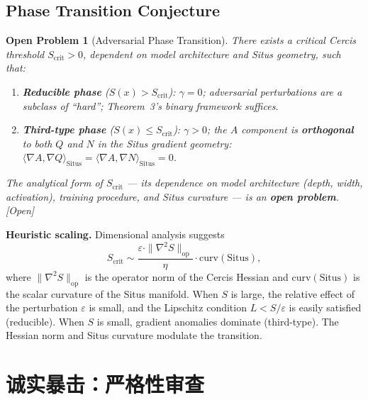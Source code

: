 \documentclass[12pt,a4paper]{article}
\newtheorem{openproblem}[theorem]{Open Problem}
\newcommand{\openquest}{\textcolor{red!70!black}{\small\textsf{[Open]}}}
\newcommand{\Situs}{\mathrm{Situs}}
\begin{document}
\subsection{Phase Transition Conjecture}

\begin{openproblem}[Adversarial Phase Transition]
\label{conj:phase}
There exists a critical Cercis threshold $S_{\mathrm{crit}} > 0$, dependent
on model architecture and Situs geometry, such that:
\begin{enumerate}[label=(\roman*)]
    \item \textbf{Reducible phase} ($S(x) > S_{\mathrm{crit}}$):
          $\gamma = 0$; adversarial perturbations are a subclass of ``hard'';
          Theorem~3's binary framework suffices.
    \item \textbf{Third-type phase} ($S(x) \leq S_{\mathrm{crit}}$):
          $\gamma > 0$; the $A$ component is \textbf{orthogonal} to both
          $Q$ and $N$ in the Situs gradient geometry:
          $\langle \nabla A, \nabla Q \rangle_{\Situs} =
           \langle \nabla A, \nabla N \rangle_{\Situs} = 0$.
\end{enumerate}
The analytical form of $S_{\mathrm{crit}}$ --- its dependence on model
architecture (depth, width, activation), training procedure, and Situs
curvature --- is an \textbf{open problem}.  \openquest
\end{openproblem}

\medskip\noindent
\textbf{Heuristic scaling.}
Dimensional analysis suggests
\begin{equation}\label{eq:Scrit-heuristic}
    S_{\mathrm{crit}} \sim
    \frac{\varepsilon \cdot \|\nabla^2 S\|_{\mathrm{op}}}{\eta}
    \cdot \mathrm{curv}(\Situs),
\end{equation}
where $\|\nabla^2 S\|_{\mathrm{op}}$ is the operator norm of the Cercis
Hessian and $\mathrm{curv}(\Situs)$ is the scalar curvature of the Situs
manifold.  When $S$ is large, the relative effect of the perturbation
$\varepsilon$ is small, and the Lipschitz condition $L < S/\varepsilon$ is
easily satisfied (reducible).  When $S$ is small, gradient anomalies dominate
(third-type).  The Hessian norm and Situs curvature modulate the transition.

\section{诚实暴击：严格性审查}
\label{sec:critique}
\end{document}
